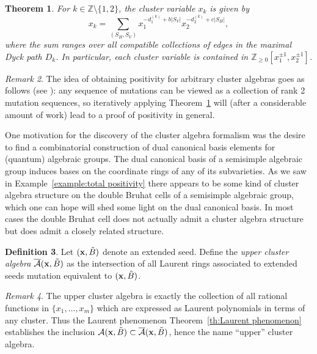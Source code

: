\documentclass{amsart}
\newtheorem{theorem}{Theorem}[section]
\theoremstyle{definition}
\newtheorem{definition}[theorem]{Definition}
\theoremstyle{remark}
\newtheorem{remark}[theorem]{Remark}
\numberwithin{equation}{section}
\newcommand{\cA}{{\mathcal{A}}}
\newcommand{\x}{{\bf x}}
\newcommand{\ZZ}{{\mathbb{Z}}}
\begin{document}
  \begin{theorem}\label{th:rank 2 positivity}\cite{LLZ14}
    For $k\in\ZZ\setminus\{1,2\}$, the cluster variable $x_k$ is given by
    \[x_k=\sum\limits_{(S_H,S_V)}x_1^{-d^{(k)}_1+b|S_V|}x_2^{-d^{(k)}_2+c|S_H|},\]
    where the sum ranges over all compatible collections of edges in the maximal Dyck path $D_k$.  In particular, each cluster variable is contained in $\ZZ_{\ge0}[x_1^{\pm1},x_2^{\pm1}]$.
  \end{theorem}

  \begin{remark}
    The idea of obtaining positivity for arbitrary cluster algebras goes as follows (see \cite{LS15}): any sequence of mutations can be viewed as a collection of rank 2 mutation sequences, so iteratively applying Theorem~\ref{th:rank 2 positivity} will (after a considerable amount of work) lead to a proof of positivity in general.
  \end{remark}

  One motivation for the discovery of the cluster algebra formalism was the desire to find a combinatorial construction of dual canonical basis elements for (quantum) algebraic groups.  The dual canonical basis of a semisimple algebraic group induces bases on the coordinate rings of any of its subvarieties.  As we saw in Example~\ref{example:total positivity} there appears to be some kind of cluster algebra structure on the double Bruhat cells of a semisimple algebraic group, which one can hope will shed some light on the dual canonical basis.  In most cases the double Bruhat cell does not actually admit a cluster algebra structure but does admit a closely related structure.

  \begin{definition}
    Let $(\x,\tilde B)$ denote an extended seed.  Define the \emph{upper cluster algebra} $\overline{\cA}(\x,\tilde B)$ as the intersection of all Laurent rings associated to extended seeds mutation equivalent to $(\x,\tilde B)$.
  \end{definition}

  \begin{remark}
    The upper cluster algebra is exactly the collection of all rational functions in $\{x_1,\ldots,x_m\}$ which are expressed as Laurent polynomials in terms of any cluster.  Thus the Laurent phenomenon Theorem~\ref{th:Laurent phenomenon} establishes the inclusion $\cA(\x,\tilde B)\subset\overline{\cA}(\x,\tilde B)$, hence the name ``upper'' cluster algebra.
  \end{remark}
\end{document}

